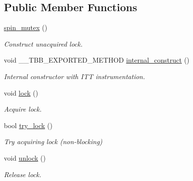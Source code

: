 \subsection*{Public Member Functions}
\begin{DoxyCompactItemize}
\item 
\hyperlink{classtbb_1_1spin__mutex_a6c96196965bf7df426311d282ad3c378}{spin\+\_\+mutex} ()
\begin{DoxyCompactList}\small\item\em Construct unacquired lock. \end{DoxyCompactList}\item 
\hypertarget{classtbb_1_1spin__mutex_a477d58c9b6c05bea717ded179d23b465}{}void \+\_\+\+\_\+\+T\+B\+B\+\_\+\+E\+X\+P\+O\+R\+T\+E\+D\+\_\+\+M\+E\+T\+H\+O\+D \hyperlink{classtbb_1_1spin__mutex_a477d58c9b6c05bea717ded179d23b465}{internal\+\_\+construct} ()\label{classtbb_1_1spin__mutex_a477d58c9b6c05bea717ded179d23b465}

\begin{DoxyCompactList}\small\item\em Internal constructor with I\+T\+T instrumentation. \end{DoxyCompactList}\item 
\hypertarget{classtbb_1_1spin__mutex_a8957e40b0781192419d01d28e5205ec4}{}void \hyperlink{classtbb_1_1spin__mutex_a8957e40b0781192419d01d28e5205ec4}{lock} ()\label{classtbb_1_1spin__mutex_a8957e40b0781192419d01d28e5205ec4}

\begin{DoxyCompactList}\small\item\em Acquire lock. \end{DoxyCompactList}\item 
bool \hyperlink{classtbb_1_1spin__mutex_a003ffb196d22bf22ca22142338b7eeab}{try\+\_\+lock} ()
\begin{DoxyCompactList}\small\item\em Try acquiring lock (non-\/blocking) \end{DoxyCompactList}\item 
\hypertarget{classtbb_1_1spin__mutex_adfcf8fe840aa73c08c2cadd570fd48fd}{}void \hyperlink{classtbb_1_1spin__mutex_adfcf8fe840aa73c08c2cadd570fd48fd}{unlock} ()\label{classtbb_1_1spin__mutex_adfcf8fe840aa73c08c2cadd570fd48fd}

\begin{DoxyCompactList}\small\item\em Release lock. \end{DoxyCompactList}\end{DoxyCompactItemize}
